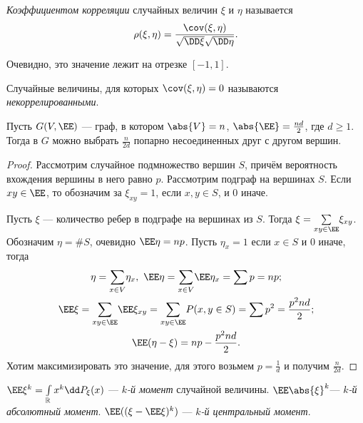  \begin{definition}\textit{Коэффициентом корреляции} случайных величин $\xi$ и $\eta$ называется
     $$\rho(\xi, \eta) = \frac{\cov(\xi, \eta)}{\sqrt{\DD \xi}\sqrt{\DD \eta}}.$$
 \end{definition}
Очевидно, это значение лежит на отрезке $[-1, 1]$.
 \begin{definition}
     Случайные величины, для которых $\cov(\xi, \eta) = 0$ называются \textit{некоррелированными}.
 \end{definition}

 \begin{example} Пусть $G(V, \EE )$ --- граф, в котором $\abs{V} = n$,  $\abs{\EE} = \frac{nd}{2}$, где $d\ge1$. Тогда в $G$ можно выбрать $\frac{n}{2d}$ попарно несоединенных друг с другом вершин.
 \end{example}
     \begin{proof}
         Рассмотрим случайное подмножество вершин $S$, причём вероятность вхождения вершины в него равно $p$. Рассмотрим подграф на вершинах $S$. Если $xy \in \EE $, то обозначим за $\xi_{xy} =1$, если $x, y\in S$, и 0 иначе. 
         
        Пусть $\xi$ --- количество ребер в подграфе на вершинах из $S$. Тогда $\xi = \underset{xy\in \EE }{\sum}\xi_{xy}$. Обозначим
         $\eta = \#S$, очевидно $\EE \eta = np$. Пусть $\eta_x = 1$ если $x\in S$ и 0 иначе, тогда
         \begin{gather*}
             \eta = \underset{x\in V}{\sum}\eta_x, \ \EE \eta = \underset{x\in V}{\sum} \EE \eta_x = \sum p = np;\\
             \EE \xi = \underset{xy\in \EE }{\sum} \EE \xi_{xy} = \underset{xy\in \EE }{\sum} P(x, y \in S) = \sum p^2  = \frac{p^2 nd}{2};\\
             \EE (\eta - \xi) = np - \frac{p^2nd}{2}.
         \end{gather*}
         Хотим максимизировать это значение, для этого возьмем $p = \frac{1}{d}$ и получим $\frac{n}{2d}$.
     \end{proof}




 \begin{definition}
     $\EE \xi^k = \int\limits_\mathbb{R}x^k \dd P_\xi(x)$ --- \textit{$k$-й момент} случайной величины. 
     $\EE \abs{\xi}^k$--- \textit{$k$-й абсолютный момент}. 
     $\EE ((\xi - \EE \xi)^k)$ --- \textit{$k$-й центральный момент}.
 \end{definition}

